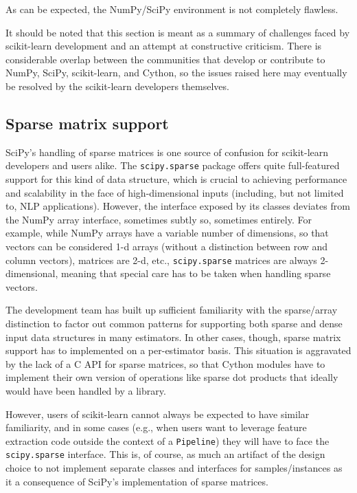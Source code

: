 \documentclass[a4paper]{article}
\begin{document}
As can be expected, the NumPy/SciPy environment is not completely flawless.

It should be noted that this section is meant
as a summary of challenges faced by scikit-learn development
and an attempt at constructive criticism.
There is considerable overlap between the communities
that develop or contribute to NumPy, SciPy, scikit-learn, and Cython,
so the issues raised here may eventually be resolved
by the scikit-learn developers themselves.

\subsection{Sparse matrix support}

SciPy's handling of sparse matrices is one source of confusion
for scikit-learn developers and users alike.
The \texttt{scipy.sparse} package offers quite full-featured support
for this kind of data structure,
which is crucial to achieving performance and scalability
in the face of high-dimensional inputs
(including, but not limited to, NLP applications).
However, the interface exposed by its classes
deviates from the NumPy array interface, sometimes subtly so,
sometimes entirely.  %
For example, while NumPy arrays have a variable number of dimensions,
so that vectors can be considered 1-d arrays
(without a distinction between row and column vectors),
matrices are 2-d, etc., \texttt{scipy.sparse} matrices are always 2-dimensional,
meaning that special care has to be taken when handling sparse vectors.

The development team has built up sufficient familiarity
with the sparse/array distinction to factor out common patterns
for supporting both sparse and dense input data structures in many estimators.
In other cases, though, sparse matrix support has to implemented
on a per-estimator basis.
This situation is aggravated by the lack of a C API for sparse matrices,
so that Cython modules have to implement their own version
of operations like sparse dot products
that ideally would have been handled by a library.

However, users of scikit-learn cannot always be expected
to have similar familiarity, and in some cases
(e.g., when users want to leverage feature extraction code
outside the context of a \texttt{Pipeline})
they will have to face the \texttt{scipy.sparse} interface.
This is, of course, as much an artifact of the design choice
to not implement separate classes and interfaces for samples/instances
as it a consequence of SciPy's implementation of sparse matrices.
\end{document}

